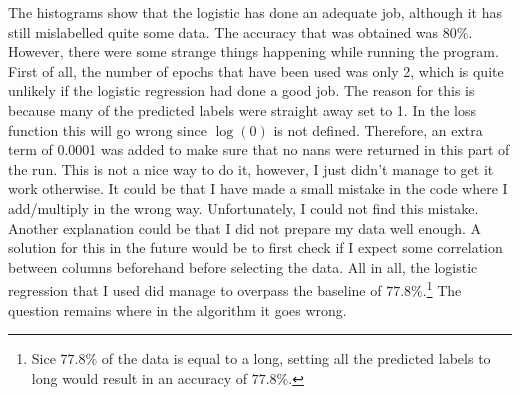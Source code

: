 The histograms show that the logistic has done an adequate job, although it has still mislabelled quite some data. The accuracy that was obtained was $80\%$. However, there were some strange things happening while running the program. First of all, the number of epochs that have been used was only 2, which is quite unlikely if the logistic regression had done a good job. The reason for this is because many of the predicted labels were straight away set to 1. In the loss function this will go wrong since $\log(0)$ is not defined. Therefore, an extra term of 0.0001 was added to make sure that no nans were returned in this part of the run. This is not a nice way to do it, however, I just didn't manage to get it work otherwise. It could be that I have made a small mistake in the code where I add/multiply in the wrong way. Unfortunately, I could not find this mistake. Another explanation could be that I did not prepare my data well enough. A solution for this in the future would be to first check if I expect some correlation between columns beforehand before selecting the data. All in all, the logistic regression that I used did manage to overpass the baseline of $77.8\%$.\footnote{Sice $77.8\%$ of the data is equal to a long, setting all the predicted labels to long would result in an accuracy of $77.8\%$.} The question remains where in the algorithm it goes wrong.